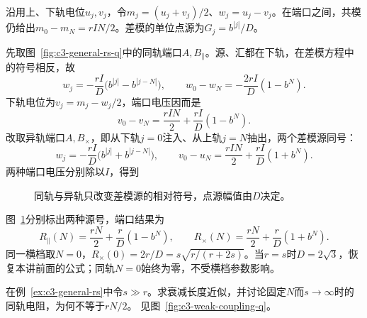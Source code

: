 \begin{solution}
沿用上、下轨电位$u_j,v_j$，令$m_j=(u_j+v_j)/2$、$w_j=u_j-v_j$。在端口之间，共模仍给出$m_0-m_N=rIN/2$。差模的单位点源为$G_j=b^{|j|}/D$。

先取图~\ref{fig:c3-general-rs-q}中的同轨端口$A,B_{\parallel}$。源、汇都在下轨，在差模方程中的符号相反，故
\[
 w_j=-\frac{rI}{D}\bigl(b^{|j|}-b^{|j-N|}\bigr),
 \qquad w_0-w_N=-\frac{2rI}{D}(1-b^N).
\]
下轨电位为$v_j=m_j-w_j/2$，端口电压因而是
\[
 v_0-v_N=\frac{rIN}{2}+\frac{rI}{D}(1-b^N).
\]
改取异轨端口$A,B_{\times}$，即从下轨$j=0$注入、从上轨$j=N$抽出，两个差模源同号：
\[
 w_j=-\frac{rI}{D}\bigl(b^{|j|}+b^{|j-N|}\bigr),
 \qquad v_0-u_N=\frac{rIN}{2}+\frac{rI}{D}(1+b^N).
\]
两种端口电压分别除以$I$，得到

\begin{figure}[H]\centering
{}
\caption{同轨与异轨只改变差模源的相对符号，点源幅值由$D$决定。}\label{fig:c3-general-rs-s}
\end{figure}

图~\ref{fig:c3-general-rs-s}分别标出两种源号，端口结果为
\[
 \boxed{R_{\parallel}(N)=\frac{rN}2+\frac rD(1-b^N)},
 \qquad
 \boxed{R_\times(N)=\frac{rN}2+\frac rD(1+b^N)}.
\]
同一横档取$N=0$，$R_\times(0)=2r/D=s\sqrt{r/(r+2s)}$。当$r=s$时$D=2\sqrt3$，恢复本讲前面的公式；同轨$N=0$始终为零，不受横档参数影响。
\end{solution}

\begin{example}[横档很大时的极限次序]\label{ex:c3-weak-coupling}
在例~\ref{ex:c3-general-rs}中令$s\gg r$。求衰减长度近似，并讨论固定$N$而$s\to\infty$时的同轨电阻，为何不等于$rN/2$。 见图~\ref{fig:c3-weak-coupling-q}。
\end{example}

